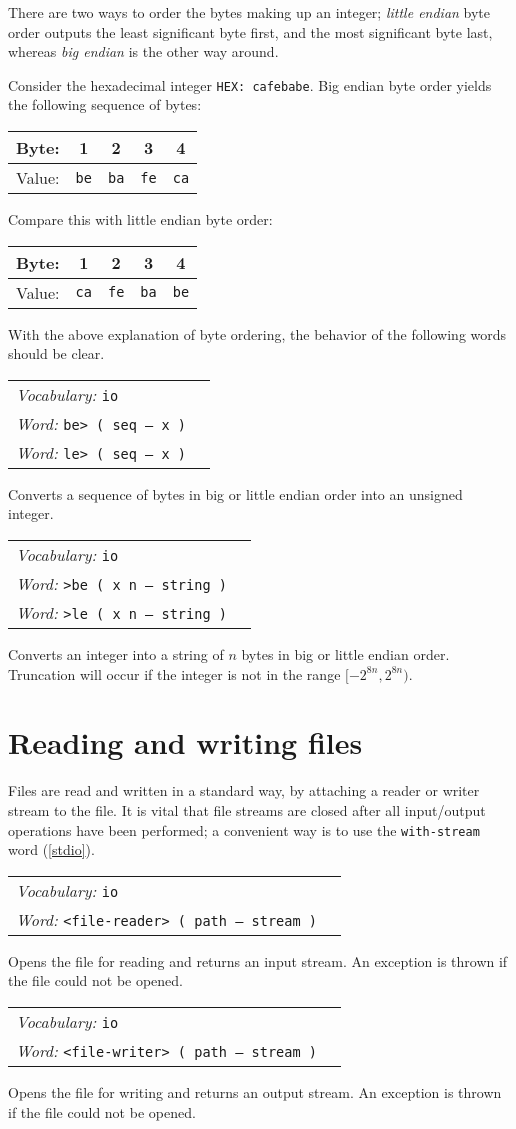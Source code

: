 \documentclass{book}
\newcommand{\vocabulary}[1]{\emph{Vocabulary:} \texttt{#1}&\\}
\newcommand{\ordinaryword}[2]{\index{\texttt{#1}}\emph{Word:} \texttt{#2}&\\}
\newcommand{\wordtable}[1]{


\begin{tabularx}{12cm}{lX}
\hline
#1
\hline
\end{tabularx}

}
\begin{document}
There are two ways to order the bytes making up an integer; \emph{little endian} byte order outputs the least significant byte first, and the most significant byte last, whereas \emph{big endian} is the other way around.

Consider the hexadecimal integer \texttt{HEX: cafebabe}. Big endian byte order yields the following sequence of bytes:

\begin{tabular}{l|c|c|c|c}
Byte:&1&2&3&4\\
\hline
Value:&\verb|be|&\verb|ba|&\verb|fe|&\verb|ca|\\
\end{tabular}

Compare this with little endian byte order:

\begin{tabular}{l|c|c|c|c}
Byte:&1&2&3&4\\
\hline
Value:&\verb|ca|&\verb|fe|&\verb|ba|&\verb|be|\\
\end{tabular}

With the above explanation of byte ordering, the behavior of the following words should be clear.

\wordtable{
\vocabulary{io}
\ordinaryword{be>}{be> ( seq -- x )}
\ordinaryword{le>}{le> ( seq -- x )}
}
Converts a sequence of bytes in big or little endian order into an unsigned integer.
\wordtable{
\vocabulary{io}
\ordinaryword{>be}{>be ( x n -- string )}
\ordinaryword{>le}{>le ( x n -- string )}
}
Converts an integer into a string of $n$ bytes in big or little endian order. Truncation will occur if the integer is not in the range $[-2^{8n},2^{8n})$.

\section{Reading and writing files}

Files are read and written in a standard way, by attaching a reader or writer stream to the file. It is vital that file streams are closed after all input/output operations have been performed; a convenient way is to use the \verb|with-stream| word (\ref{stdio}).

\wordtable{
\vocabulary{io}
\ordinaryword{<file-reader>}{<file-reader> ( path -- stream )}

}
Opens the file for reading and returns an input stream. An exception is thrown if the file could not be opened.
\wordtable{
\vocabulary{io}
\ordinaryword{<file-writer>}{<file-writer> ( path -- stream )}

}
Opens the file for writing and returns an output stream. An exception is thrown if the file could not be opened.
\end{document}
